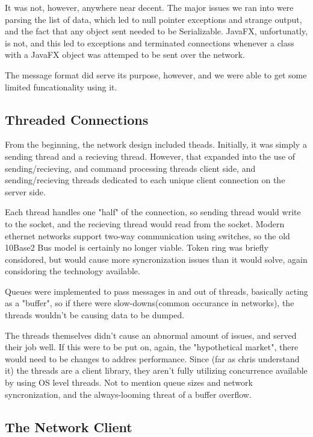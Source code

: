 \documentclass[12pt,a4paper]{article}
\begin{document}
It was not, however, anywhere near decent. The major issues we ran into were parsing the list of data, which led to null pointer exceptions
and strange output, and the fact that any object sent needed to be Serializable. JavaFX, unfortunatly, is not, and this led to exceptions and terminated
connections whenever a class with a JavaFX object was attemped to be sent over the network.

The message format did serve its purpose, however, and we were able to get some limited funcationality using it.

\subsection{Threaded Connections}

From the beginning, the network design included theads. Initially, it was simply a sending thread and a recieving thread. 
However, that expanded into the use of sending/recieving, and command processing threads client side, and sending/recieving threads
dedicated to each unique client connection on the server side.

Each thread handles one "half" of the connection, so sending thread would write to the socket, and the recieving thread would read from the socket. Modern ethernet networks
support two-way communication using switches, so the old 10Base2 Bus model is certainly no longer viable. Token ring was briefly considored, but would cause more syncronization issues
than it would solve, again considoring the technology available. 

Queues were implemented to pass messages in and out of threads, basically acting as a "buffer", so if there were slow-downs(common occurance in networks), 
the threads wouldn't be causing data to be dumped.

The threads themselves didn't cause an abnormal amount of issues, and served their job well. 
If this were to be put on, again, the "hypothetical market", there would need to be changes to addres performance. Since (far as chris understand it) the threads
are a client library, they aren't fully utilizing concurrence available by using OS level threads. Not to mention queue sizes and network syncronization, and the always-looming
threat of a buffer overflow.

\subsection{The Network Client}
\end{document}
